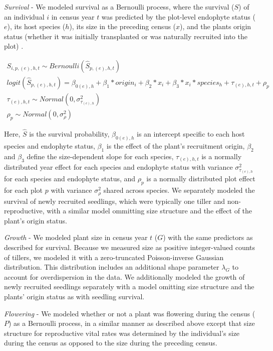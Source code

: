 \documentclass[12pt]{article}
\begin{document}
\emph{Survival} - We modeled survival as a Bernoulli process, where the survival ($S$) of an individual $i$ in census year $t$ was predicted by the plot-level endophyte status ($e$), its host species ($h$), its size in the preceding census ($x$), and the plants origin status (whether it was initially transplanted or was naturally recruited into the plot) .

\begin{subequations}
	\label{eq:survival}
	\begin{align}
	    S_{i,p,(e),h,t} \sim Bernoulli(\hat{S}_{p,(e),h,t})\\
	    logit(\hat{S}_{p,(e),h,t}) = \beta_{0(e),h} + \beta_1*origin_{i} + \beta_2*x_{i} + \beta_3*x_{i}*species_{h} + \tau_{(e),h,t} + \rho_{p}\\
	    \tau_{(e),h,t} \sim Normal(0,\sigma^2_{\tau_{(e),h}})\\
	    \rho_{p} \sim Normal(0,\sigma^2_{\rho})
	\end{align}
\end{subequations}

Here, $\hat{S}$ is the survival probability, $\beta_{0(e),h}$ is an intercept specific to each host species and endophyte status, $\beta_1$ is the effect of the plant's recruitment origin, $\beta_2$ and $\beta_3$ define the size-dependent slope for each species, $\tau_{(e),h,t}$ is a normally distributed year effect for each species and endophyte status with variance $\sigma^2_{\tau_{(e),h}}$ for each species and endophyte status, and 
$\rho_{p}$ is a normally distributed plot effect for each plot $p$ with variance $\sigma^2_{\rho}$ shared across species.
We separately modeled the survival of newly recruited seedlings, which were typically one tiller and non-reproductive, with a similar model ommitting size structure and the effect of the plant's origin status.


\emph{Growth} - We modeled plant size in census year $t$ ($G$) with the same predictors as described for survival.
Because we measured size as positive integer-valued counts of tillers, we modeled it with a zero-truncated Poisson-inverse Gaussian distribution.
This distribution includes an additional shape parameter $\lambda_G$ to account for overdispersion in the data.
We additionally modeled the growth of newly recruited seedlings separately with a model omitting size structure and the plants' origin status as with seedling survival. 

\emph{Flowering} - We modeled whether or not a plant was flowering during the census ($P$) as a Bernoulli process, in a similar manner as described above except that size structure for reproductive vital rates was determined by the individual's size during the census as opposed to the size during the preceding census.
\end{document}
